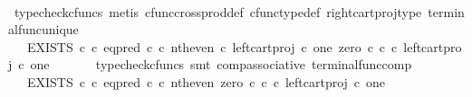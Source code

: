 \begin{isabellebody}
\ \ \ \ \isamarkupfalse%
\ {\isacharparenleft}{\kern0pt}typecheck{\isacharunderscore}{\kern0pt}cfuncs{\isacharcomma}{\kern0pt}\ metis\ cfunc{\isacharunderscore}{\kern0pt}cross{\isacharunderscore}{\kern0pt}prod{\isacharunderscore}{\kern0pt}def\ cfunc{\isacharunderscore}{\kern0pt}type{\isacharunderscore}{\kern0pt}def\ right{\isacharunderscore}{\kern0pt}cart{\isacharunderscore}{\kern0pt}proj{\isacharunderscore}{\kern0pt}type\ terminal{\isacharunderscore}{\kern0pt}func{\isacharunderscore}{\kern0pt}unique{\isacharparenright}{\kern0pt}\isanewline
\ \ \isamarkupfalse%
\ \isamarkupfalse%
\ {\isachardoublequoteopen}{\isachardot}{\kern0pt}{\isachardot}{\kern0pt}{\isachardot}{\kern0pt}\ {\isacharequal}{\kern0pt}\ EXISTS\ {\isasymnat}\isactrlsub c\ {\isasymcirc}\isactrlsub c\ {\isacharparenleft}{\kern0pt}eq{\isacharunderscore}{\kern0pt}pred\ {\isasymnat}\isactrlsub c\ {\isasymcirc}\isactrlsub c\ {\isasymlangle}nth{\isacharunderscore}{\kern0pt}even\ {\isasymcirc}\isactrlsub c\ left{\isacharunderscore}{\kern0pt}cart{\isacharunderscore}{\kern0pt}proj\ {\isasymnat}\isactrlsub c\ one{\isacharcomma}{\kern0pt}\ {\isacharparenleft}{\kern0pt}zero\ {\isasymcirc}\isactrlsub c\ {\isasymbeta}\isactrlbsub {\isasymnat}\isactrlsub c\isactrlesub {\isacharparenright}{\kern0pt}\ {\isasymcirc}\isactrlsub c\ left{\isacharunderscore}{\kern0pt}cart{\isacharunderscore}{\kern0pt}proj\ {\isasymnat}\isactrlsub c\ one{\isasymrangle}\ {\isacharparenright}{\kern0pt}\isactrlsup {\isasymsharp}{\isachardoublequoteclose}\isanewline
\ \ \ \ \isamarkupfalse%
\ {\isacharparenleft}{\kern0pt}typecheck{\isacharunderscore}{\kern0pt}cfuncs{\isacharcomma}{\kern0pt}\ smt\ comp{\isacharunderscore}{\kern0pt}associative{}\ terminal{\isacharunderscore}{\kern0pt}func{\isacharunderscore}{\kern0pt}comp{\isacharparenright}{\kern0pt}\isanewline
\ \ \isamarkupfalse%
\ \isamarkupfalse%
\ {\isachardoublequoteopen}{\isachardot}{\kern0pt}{\isachardot}{\kern0pt}{\isachardot}{\kern0pt}\ {\isacharequal}{\kern0pt}\ EXISTS\ {\isasymnat}\isactrlsub c\ {\isasymcirc}\isactrlsub c\ {\isacharparenleft}{\kern0pt}{\isacharparenleft}{\kern0pt}eq{\isacharunderscore}{\kern0pt}pred\ {\isasymnat}\isactrlsub c\ {\isasymcirc}\isactrlsub c\ {\isasymlangle}nth{\isacharunderscore}{\kern0pt}even{\isacharcomma}{\kern0pt}\ zero\ {\isasymcirc}\isactrlsub c\ {\isasymbeta}\isactrlbsub {\isasymnat}\isactrlsub c\isactrlesub {\isasymrangle}{\isacharparenright}{\kern0pt}\ {\isasymcirc}\isactrlsub c\ left{\isacharunderscore}{\kern0pt}cart{\isacharunderscore}{\kern0pt}proj\ {\isasymnat}\isactrlsub c\ one{\isacharparenright}{\kern0pt}\isactrlsup {\isasymsharp}{\isachardoublequoteclose}\isanewline

\end{isabellebody}
